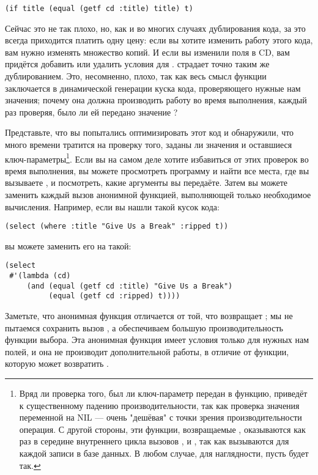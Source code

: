 \begin{lstlisting}
(if title (equal (getf cd :title) title) t)
\end{lstlisting}

Сейчас это не так плохо, но, как и во многих случаях дублирования кода, за это всегда
приходится платить одну цену: если вы хотите изменить работу этого кода, вам нужно
изменять множество копий. И если вы изменили поля в CD, вам придётся добавить или удалить
условия для .  страдает точно таким же дублированием. Это,
несомненно, плохо, так как весь смысл функции  заключается в динамической
генерации куска кода, проверяющего нужные нам значения; почему она должна производить
работу во время выполнения, каждый раз проверяя, было ли ей передано значение
?

Представьте, что вы попытались оптимизировать этот код и обнаружили, что много времени
тратится на проверку того, заданы ли значения  и оставшиеся
ключ-параметры\footnote{Вряд ли проверка того, был ли ключ-параметр передан в функцию,
  приведёт к существенному падению производительности, так как проверка значения
  переменной на NIL --- очень "дешёвая" с точки зрения производительности операция. С
  другой стороны, эти функции, возвращаемые , оказываются как раз в середине
  внутреннего цикла вызовов ,  и , так как
  вызываются для каждой записи в базе данных. В любом случае, для наглядности, пусть будет
  так.}. Если вы на самом деле хотите избавиться от этих проверок во время выполнения, вы
можете просмотреть программу и найти все места, где вы вызываете , и
посмотреть, какие аргументы вы передаёте. Затем вы можете заменить каждый вызов
 анонимной функцией, выполняющей только необходимое вычисления. Например, если
вы нашли такой кусок кода:

\begin{lstlisting}
(select (where :title "Give Us a Break" :ripped t))
\end{lstlisting}

вы можете заменить его на такой:

\begin{lstlisting}
(select
 #'(lambda (cd)
     (and (equal (getf cd :title) "Give Us a Break")
          (equal (getf cd :ripped) t))))
\end{lstlisting}

Заметьте, что анонимная функция отличается от той, что возвращает ; мы не
пытаемся сохранить вызов , а обеспечиваем большую производительность функции
выбора. Эта анонимная функция имеет условия только для нужных нам полей, и она не
производит дополнительной работы, в отличие от функции, которую может возвратить
.

